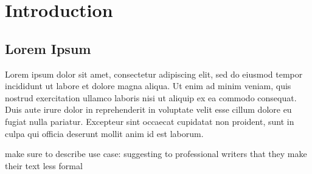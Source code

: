 
\chapter{Introduction} %

\label{Chapter01} %

\section{Lorem Ipsum}

Lorem ipsum dolor sit amet, consectetur adipiscing elit, sed do eiusmod tempor incididunt ut labore et dolore magna aliqua. Ut enim ad minim veniam, quis nostrud exercitation ullamco laboris nisi ut aliquip ex ea commodo consequat. Duis aute irure dolor in reprehenderit in voluptate velit esse cillum dolore eu fugiat nulla pariatur. Excepteur sint occaecat cupidatat non proident, sunt in culpa qui officia deserunt mollit anim id est laborum.

make sure to describe use case: suggesting to professional writers that they make their text less formal